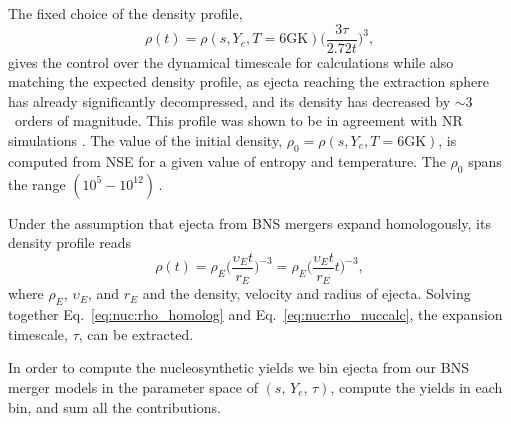 The fixed choice of the density profile,
\begin{equation}
\rho(t) = \rho(s, Y_e, T=6\text{GK})\Big(\frac{3\tau}{2.72 t}\Big)^3, 
\label{eq:nuc:rho_nuccalc}
\end{equation}
gives the control over the dynamical timescale for \rproc{} calculations 
while also matching the expected density profile, 
as ejecta reaching the extraction sphere has already 
significantly decompressed, and its density has decreased 
by ${\sim}3$~orders of magnitude. 
%
This profile was shown to be in agreement with \ac{NR} simulations 
\citep{Lippuner:2015gwa,Foucart:2014nda}. 
%
The value of the initial density, 
$\rho_0 = \rho(s, Y_e, T=6\text{GK})$, 
is computed from \ac{NSE} for a given value of entropy and 
temperature. 
The $\rho_0$ spans the range $(10^5 - 10^{12})\,$\gcm.
%

Under the assumption that ejecta from \ac{BNS} mergers expand homologously, 
its density profile reads
%
\begin{equation}
\rho(t) = \rho_E\Big(\frac{\upsilon_E t}{r_E}\Big)^{-3} = 
\rho_E\Big(\frac{\upsilon_E t}{r_E}t\Big)^{-3},
\label{eq:nuc:rho_homolog}
\end{equation}
%
where $\rho_E$, $\upsilon_E$, and $r_E$ and the density, velocity and radius of 
ejecta. 
%
Solving together Eq.~\eqref{eq:nuc:rho_homolog} and Eq.~\eqref{eq:nuc:rho_nuccalc},
the expansion timescale, $\tau$, can be extracted.


In order to compute the nucleosynthetic yields we bin ejecta from our \ac{BNS} 
merger models in the parameter space of $(s, \, Y_e,\, \tau)$, compute the yields 
in each bin, and sum all the contributions.
%

